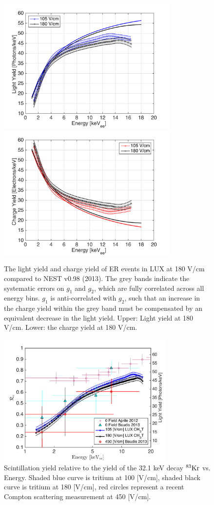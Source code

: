 \begin{figure}[h!]\centering
\includegraphics[width=90mm]{fig/ER_LY.png}
\includegraphics[width=90mm]{fig/ER_QY.png}
\caption{The light yield and charge yield of ER events in LUX at 180 V/cm compared to NEST v0.98 (2013). The grey bands indicate the systematic errors on $g_1$ and $g_2$, which are fully correlated across all energy bins. $g_1$ is anti-correlated with $g_2$, such that an increase in the charge yield within the grey band must be compensated by an equivalent decrease in the light yield. Upper: Light yield at 180 V/cm. Lower: the charge yield at 180 V/cm.}
\label{fig:ER-LY-QY}
\end{figure}

 \begin{figure}[h!]\centering
\includegraphics[width=88mm]{fig/Re_LY_log.png}
\caption{Scintillation yield relative to the yield of the 32.1 keV decay $\rm^{83}Kr $  vs. Energy. Shaded blue curve is tritium at 100 [V/cm], shaded black curve is tritium at 180 [V/cm], red circles represent a recent Compton scattering measurement at 450 [V/cm]. }
\label{fig:Re_LY}
\end{figure}



